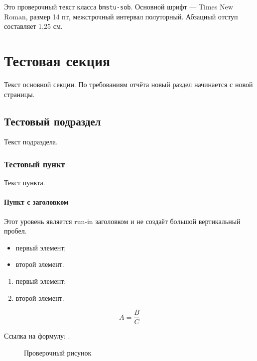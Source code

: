 \documentclass{bmstu-sob}
\begin{document}
\tableofcontents

\bmstuIntroduction

Это проверочный текст класса \texttt{bmstu-sob}. Основной шрифт — Times New Roman, размер 14 пт, межстрочный интервал полуторный. Абзацный отступ составляет 1,25 см.

\section{Тестовая секция}
Текст основной секции. По требованиям отчёта новый раздел начинается с новой страницы.

\subsection{Тестовый подраздел}
Текст подраздела.

\subsubsection{Тестовый пункт}
Текст пункта.

\paragraph{Пункт с заголовком}
Этот уровень является run-in заголовком и не создаёт большой вертикальный пробел.

\begin{itemize}
  \item первый элемент;
  \item второй элемент.
\end{itemize}

\begin{enumerate}
  \item первый элемент;
  \item второй элемент.
\end{enumerate}

\begin{equation}
  A = \frac{B}{C}
  \label{eq:test}
\end{equation}

\begin{bmstuwherelist}
\end{bmstuwherelist}

Ссылка на формулу: .

\begin{figure}[htbp]
  \centering
  \fbox{\rule{0pt}{35mm}\rule{75mm}{0pt}}
  \caption{Проверочный рисунок}
  \label{fig:test}
\end{figure}
\end{document}
